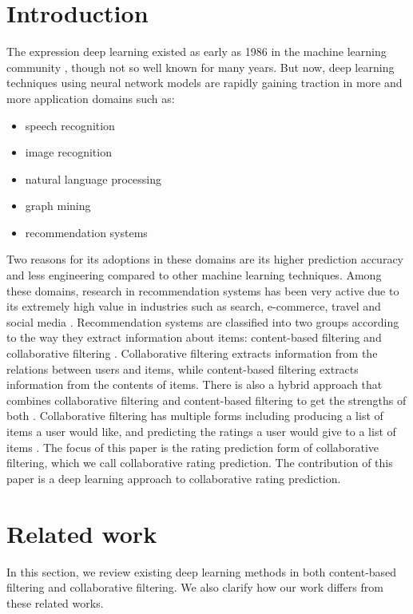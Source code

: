 \documentclass[sigconf]{acmart}
\begin{document}
\section{Introduction}
The expression deep learning existed as early as 1986 in the machine learning 
community \cite{dechter1986learning}, though not so well known for many 
years.
But now, deep learning techniques using neural network models are rapidly 
gaining traction in more and more application domains such as:
\begin{itemize}
	\item speech recognition \cite{hannun2014deep}
	\item image recognition \cite{simonyan2014very}
	\item natural language processing \cite{yao2013recurrent}
	\item graph mining \cite{grovernode2vec}
	\item recommendation systems \cite{barkan2016item2vec}
\end{itemize}
Two reasons for its adoptions in these domains are its higher prediction 
accuracy and less engineering compared to other machine learning techniques.
Among these domains, research in recommendation systems has been very active  
due to its extremely high value in industries such as search, e-commerce, 
travel and social media \cite{buettner2016predicting}.
Recommendation systems are classified into two groups according to the way they 
extract information about items: content-based filtering and collaborative 
filtering \cite{ricci2011introduction}.
Collaborative filtering extracts information from the relations between users 
and items, while content-based filtering extracts information from the contents 
of items.
There is also a hybrid approach that combines collaborative filtering and 
content-based filtering to get the strengths of both 
\cite{adomavicius2005toward}.
Collaborative filtering has multiple forms including producing a list of items 
a user would like, and predicting the ratings a user would give to a list of 
items \cite{su2009survey}.
The focus of this paper is the rating prediction form of collaborative 
filtering, which we call collaborative rating prediction.
The contribution of this paper is a deep learning approach to collaborative 
rating prediction.

\section{Related work}
In this section,
we review existing deep learning methods in both content-based 
filtering and collaborative filtering.
We also clarify how our work differs from these related works.
\end{document}
